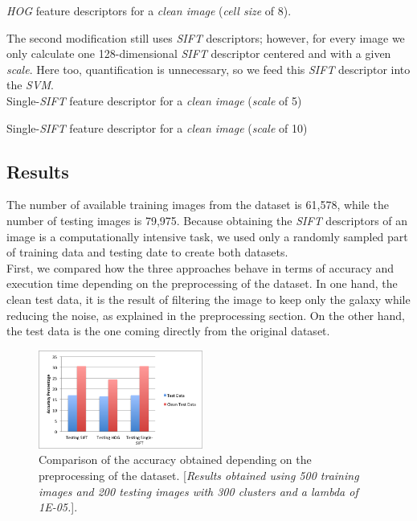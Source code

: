 \documentclass{vldb}
\begin{document}
{\emph{HOG} feature descriptors for a \emph{clean image} (\emph{cell size} of 8).}

The second modification still uses \emph{SIFT} descriptors; however, for every image we only calculate one 128-dimensional \emph{SIFT} descriptor centered and with a given \emph{scale}. Here too, quantification is unnecessary, so we feed this \emph{SIFT} descriptor into the \emph{SVM}. \\

{Single-\emph{SIFT} feature descriptor for a \emph{clean image} (\emph{scale} of 5)}

{Single-\emph{SIFT} feature descriptor for a \emph{clean image} (\emph{scale} of 10)}

\subsection{Results}
The number of available training images from the dataset is 61,578, while the number of testing images is 79,975. Because obtaining the \emph{SIFT} descriptors of an image is a computationally intensive task, we used only a randomly sampled part of training data and testing date to create both datasets. \\

First, we compared how the three approaches behave in terms of accuracy and execution time depending on the preprocessing of the dataset. In one hand, the clean test data, it is the result of filtering the image to keep only the galaxy while reducing the noise, as explained in the preprocessing section. On the other hand, the test data is the one coming directly from the original dataset.

\begin{figure}[!ht]
    \centering
    \includegraphics[width=0.48\textwidth, trim=0 0 0 0, clip]{../Images/6_CleanVsReg.png}
    \caption{Comparison of the accuracy obtained depending on the preprocessing of the dataset. [\emph{Results obtained using 500 training images and 200 testing images with 300 clusters and a \emph{lambda} of 1E-05.}].}
\end{figure}
\FloatBarrier
\end{document}
